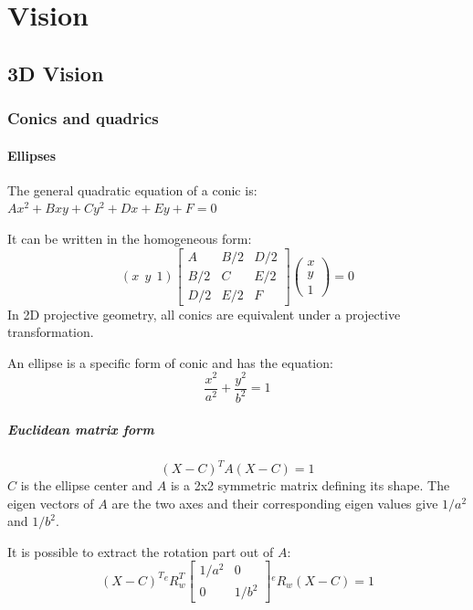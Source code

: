 \part{Vision}

\chapter{3D Vision}

\section{Conics and quadrics}

\subsection{Ellipses}
The general quadratic equation of a conic is: $Ax^2 + Bxy + Cy^2 + Dx + Ey + F = 0 $

It can be written in the homogeneous form:
\begin{equation}
(x~~y~~1) \left[\begin{array}{ccc}
     A & B/2 & D/2  \\
     B/2 & C & E/2 \\
     D/2 & E/2 & F
\end{array}\right] 
\left( \begin{array}{c}
     x  \\
     y \\
     1
\end{array} \right)
= 0
\end{equation}
In 2D projective geometry, all conics are equivalent under a projective transformation.

An ellipse is a specific form of conic and has the equation:
\begin{equation}
\frac{x^2}{a^2} + \frac{y^2}{b^2} = 1
\end{equation}

\subsubsection{Euclidean matrix form}
\begin{equation}
    (X - C)^T A (X - C) = 1
\end{equation}
$C$ is the ellipse center and $A$ is a 2x2 symmetric matrix defining its shape. The eigen vectors of $A$ are the two axes and their corresponding eigen values give $1/a^2$ and $1/b^2$.

It is possible to extract the rotation part out of $A$:
\begin{equation}
(X - C)^T {}^{e}R_{w}^T \left[ \begin{array}{cc}
    1/a^2 & 0 \\
    0 & 1/b^2
\end{array}
\right] {}^{e}R_{w} (X - C) = 1
\end{equation}

